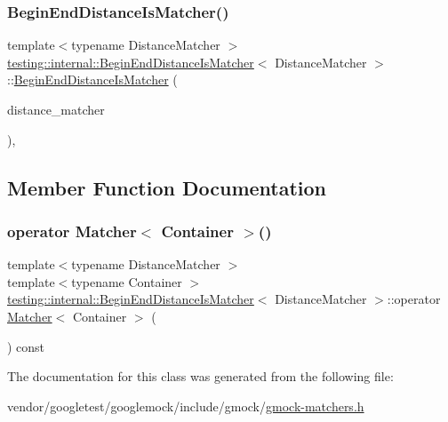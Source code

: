 \subsubsection{\texorpdfstring{Begin\+End\+Distance\+Is\+Matcher()}{BeginEndDistanceIsMatcher()}}
{\footnotesize\ttfamily template$<$typename Distance\+Matcher $>$ \\
\hyperlink{classtesting_1_1internal_1_1_begin_end_distance_is_matcher}{testing\+::internal\+::\+Begin\+End\+Distance\+Is\+Matcher}$<$ Distance\+Matcher $>$\+::\hyperlink{classtesting_1_1internal_1_1_begin_end_distance_is_matcher}{Begin\+End\+Distance\+Is\+Matcher} (\begin{DoxyParamCaption}\item[{const Distance\+Matcher \&}]{distance\+\_\+matcher }\end{DoxyParamCaption})\hspace{0.3cm}{\ttfamily [inline]}, {\ttfamily [explicit]}}



\subsection{Member Function Documentation}
\mbox{\label{classtesting_1_1internal_1_1_begin_end_distance_is_matcher_af4d79ed63bce73e5cecd6f542aeb57ce}} 
\subsubsection{\texorpdfstring{operator Matcher$<$ Container $>$()}{operator Matcher< Container >()}}
{\footnotesize\ttfamily template$<$typename Distance\+Matcher $>$ \\
template$<$typename Container $>$ \\
\hyperlink{classtesting_1_1internal_1_1_begin_end_distance_is_matcher}{testing\+::internal\+::\+Begin\+End\+Distance\+Is\+Matcher}$<$ Distance\+Matcher $>$\+::operator \hyperlink{classtesting_1_1_matcher}{Matcher}$<$ Container $>$ (\begin{DoxyParamCaption}{ }\end{DoxyParamCaption}) const\hspace{0.3cm}{\ttfamily [inline]}}



The documentation for this class was generated from the following file\+:\begin{DoxyCompactItemize}
\item 
vendor/googletest/googlemock/include/gmock/\hyperlink{gmock-matchers_8h}{gmock-\/matchers.\+h}\end{DoxyCompactItemize}
